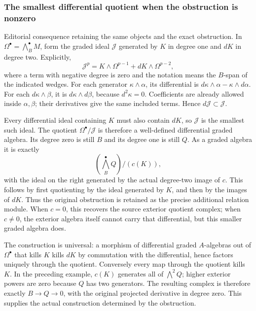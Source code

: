 \subsubsection{The smallest differential quotient when the obstruction is nonzero}\label{the-smallest-differential-quotient-when-the-obstruction-is-nonzero}

Editorial consequence retaining the same objects and the exact obstruction. In \(\Omega^\bullet=\bigwedge_B^\bullet M\), form the graded ideal \(\mathcal J\) generated by \(K\) in degree one and \(dK\) in degree two. Explicitly, \[
\mathcal J^p=K\wedge\Omega^{p-1}+dK\wedge\Omega^{p-2},
\] where a term with negative degree is zero and the notation means the \(B\)-span of the indicated wedges. For each generator \(\kappa\wedge\alpha\), its differential is \(d\kappa\wedge\alpha-\kappa\wedge d\alpha\). For each \(d\kappa\wedge\beta\), it is \(d\kappa\wedge d\beta\), because \(d^2\kappa=0\). Coefficients are already allowed inside \(\alpha,\beta\); their derivatives give the same included terms. Hence \(d\mathcal J\subset\mathcal J\).

Every differential ideal containing \(K\) must also contain \(dK\), so \(\mathcal J\) is the smallest such ideal. The quotient \(\Omega^\bullet/\mathcal J\) is therefore a well-defined differential graded algebra. Its degree zero is still \(B\) and its degree one is still \(Q\). As a graded algebra it is exactly \[
\left(\bigwedge_B^\bullet Q\right)\big/\left(c(K)\right),
\] with the ideal on the right generated by the actual degree-two image of \(c\). This follows by first quotienting by the ideal generated by \(K\), and then by the images of \(dK\). Thus the original obstruction is retained as the precise additional relation module. When \(c=0\), this recovers the source exterior quotient complex; when \(c\ne0\), the exterior algebra itself cannot carry that differential, but this smaller graded algebra does.

The construction is universal: a morphism of differential graded \(A\)-algebras out of \(\Omega^\bullet\) that kills \(K\) kills \(dK\) by commutation with the differential, hence factors uniquely through the quotient. Conversely every map through the quotient kills \(K\). In the preceding example, \(c(K)\) generates all of \(\bigwedge^2Q\); higher exterior powers are zero because \(Q\) has two generators. The resulting complex is therefore exactly \(B\to Q\to0\), with the original projected derivative in degree zero. This supplies the actual construction determined by the obstruction.

